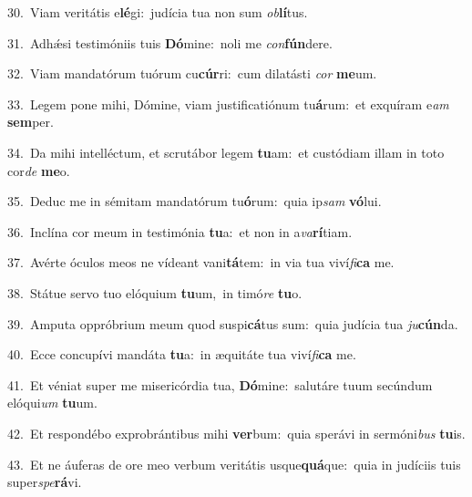 {\numbfont\textcolor{\numbcolor}{30.}}~Viam veritátis e\-\textbf{lé}\-gi:~\star judícia tua non sum \textit{ob}\-\textbf{lí}tus.\par
{\numbfont\textcolor{\numbcolor}{31.}}~Adhǽsi testimóniis tuis \textbf{Dó}\-mine:~\star noli me \textit{con}\-\textbf{fún}dere.\par
{\numbfont\textcolor{\numbcolor}{32.}}~Viam mandatórum tuórum cu\-\textbf{cúr}\-ri:~\star cum dilatásti \textit{cor} \textbf{me}\-um.\par
{\numbfont\textcolor{\numbcolor}{33.}}~Legem pone mihi, Dómine, viam justificatiónum tu\-\textbf{á}\-rum:~\star et exquíram e\textit{am} \textbf{sem}\-per.\par
{\numbfont\textcolor{\numbcolor}{34.}}~Da mihi intelléctum, et scrutábor legem \textbf{tu}\-am:~\star et custódiam illam in toto cor\textit{de} \textbf{me}\-o.\par
{\numbfont\textcolor{\numbcolor}{35.}}~Deduc me in sémitam mandatórum tu\-\textbf{ó}\-rum:~\star quia ip\textit{sam} \textbf{vó}\-lui.\par
{\numbfont\textcolor{\numbcolor}{36.}}~Inclína cor meum in testimónia \textbf{tu}\-a:~\star et non in a\-\textit{va}\-\textbf{rí}tiam.\par
{\numbfont\textcolor{\numbcolor}{37.}}~Avérte óculos meos ne vídeant vani\-\textbf{tá}\-tem:~\star in via tua viví\-\textit{fi}\-\textbf{ca} me.\par
{\numbfont\textcolor{\numbcolor}{38.}}~Státue servo tuo elóquium \textbf{tu}\-um,~\star in timó\textit{re} \textbf{tu}\-o.\par
{\numbfont\textcolor{\numbcolor}{39.}}~Amputa oppróbrium meum quod suspi\-\textbf{cá}\-tus sum:~\star quia judícia tua \textit{ju}\-\textbf{cún}da.\par
{\numbfont\textcolor{\numbcolor}{40.}}~Ecce concupívi mandáta \textbf{tu}\-a:~\star in æquitáte tua viví\-\textit{fi}\-\textbf{ca} me.\par
{\numbfont\textcolor{\numbcolor}{41.}}~Et véniat super me misericórdia tua, \textbf{Dó}\-mine:~\star salutáre tuum secúndum elóqui\textit{um} \textbf{tu}\-um.\par
{\numbfont\textcolor{\numbcolor}{42.}}~Et respondébo exprobrántibus mihi \textbf{ver}\-bum:~\star quia sperávi in sermóni\textit{bus} \textbf{tu}\-is.\par
{\numbfont\textcolor{\numbcolor}{43.}}~Et ne áuferas de ore meo verbum veritátis usque\-\textbf{quá}\-que:~\star quia in judíciis tuis super\-\textit{spe}\-\textbf{rá}vi.\par
